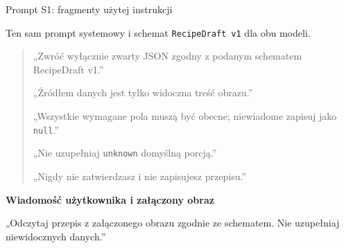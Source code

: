 \documentclass[aspectratio=169,11pt]{beamer}
\begin{document}
\begin{frame}{Prompt S1: fragmenty użytej instrukcji}
  {\small Ten sam prompt systemowy i schemat \texttt{RecipeDraft v1} dla obu modeli.\par}
  \begin{quote}
    \small
    „Zwróć wyłącznie zwarty JSON zgodny z podanym schematem RecipeDraft v1.”

    „Źródłem danych jest tylko widoczna treść obrazu.”

    „Wszystkie wymagane pola muszą być obecne; niewiadome zapisuj jako \texttt{null}.”

    „Nie uzupełniaj \texttt{unknown} domyślną porcją.”

    „Nigdy nie zatwierdzasz i nie zapisujesz przepisu.”
  \end{quote}
  \vspace{0.05cm}
  \textbf{Wiadomość użytkownika i załączony obraz}
  \par{\small „Odczytaj przepis z załączonego obrazu zgodnie ze schematem. Nie uzupełniaj niewidocznych danych.”}
\end{frame}
\end{document}
